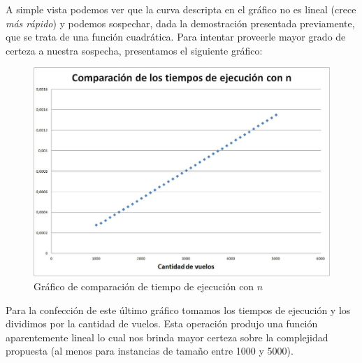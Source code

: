 \documentclass[11pt, a4paper, twoside]{article}
\begin{document}
A simple vista podemos ver que la curva descripta en el gráfico no es lineal (crece \textit{más rápido}) y podemos sospechar, dada la demostración presentada previamente, que se trata de una función cuadrática. Para intentar proveerle mayor grado de certeza a nuestra sospecha, presentamos el siguiente gráfico:

\begin{figure}[H]
\centering
\includegraphics[scale=0.5]{imagenes/graphn.jpg}
\caption{Gráfico de comparación de tiempo de ejecución con $n$}
\end{figure}

Para la confección de este último gráfico tomamos los tiempos de ejecución y los dividimos por la cantidad de vuelos. Esta operación produjo una función aparentemente lineal lo cual nos brinda mayor certeza sobre la complejidad propuesta (al menos para instancias de tamaño entre 1000 y 5000).
\end{document}
